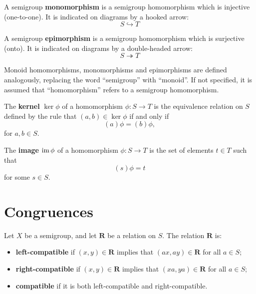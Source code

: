 \begin{definition}
  \label{def:monomorphism}
  A semigroup \textbf{monomorphism} is a semigroup homomorphism which is
  injective (one-to-one).  It is indicated on diagrams by a hooked arrow:
  $$S \hookrightarrow T$$
\end{definition}

\begin{definition}
  \label{def:epimorphism}
  A semigroup \textbf{epimorphism} is a semigroup homomorphism which is
  surjective (onto).  It is indicated on diagrams by a double-headed arrow:
  $$S \twoheadrightarrow T$$
\end{definition}

Monoid homomorphisms, monomorphisms and epimorphisms are defined analogously,
replacing the word ``semigroup'' with ``monoid''.  If not specified, it is
assumed that ``homomorphism'' refers to a semigroup homomorphism.

\begin{definition}
  The \textbf{kernel} $\ker\phi$ of a homomorphism $\phi:S \to T$ is the
  equivalence relation on $S$ defined by the rule that $(a,b) \in \ker\phi$ if
  and only if
  $$(a)\phi = (b)\phi,$$
  for $a, b \in S$.
\end{definition}

\begin{definition}
  The \textbf{image} $\operatorname{im}\phi$ of a homomorphism $\phi:S \to T$ is the set of
  elements $t \in T$ such that
  $$(s)\phi = t$$
  for some $s \in S$.
\end{definition}

\section{Congruences}
\label{sec:intro-congs}

\begin{definition}
  \label{def:compatible}
  Let $X$ be a semigroup, and let $\mathbf{R}$ be a relation on $S$.  The
  relation $\mathbf{R}$ is:
  \begin{itemize}
  \item \textbf{left-compatible} if $(x, y) \in \mathbf{R}$ implies that
    $(ax, ay) \in \mathbf{R}$ for all $a \in S$;
  \item \textbf{right-compatible} if $(x, y) \in \mathbf{R}$ implies that
    $(xa, ya) \in \mathbf{R}$ for all $a \in S$;
  \item \textbf{compatible} if it is both left-compatible and
    right-compatible.
  \end{itemize}
\end{definition}


